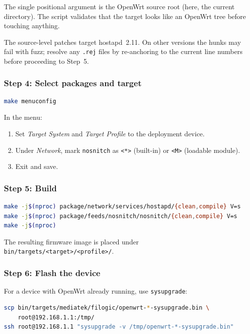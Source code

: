 \noindent The single positional argument is the OpenWrt source root
(here, the current directory). The script validates that the target
looks like an OpenWrt tree before touching anything.

The source-level patches target hostapd~2.11. On other versions the
hunks may fail with fuzz; resolve any \texttt{.rej} files by
re-anchoring to the current line numbers before proceeding to Step~5.

\subsubsection{Step 4: Select packages and target}

\begin{lstlisting}[language=bash]
make menuconfig
\end{lstlisting}

\noindent In the menu:

\begin{enumerate}
  \item Set \emph{Target System} and \emph{Target Profile} to the
  deployment device.
  \item Under \emph{Network}, mark \texttt{nosnitch} as \texttt{<*>}
  (built-in) or \texttt{<M>} (loadable module).
  \item Exit and save.
\end{enumerate}

\subsubsection{Step 5: Build}

\begin{lstlisting}[language=bash]
make -j$(nproc) package/network/services/hostapd/{clean,compile} V=s
make -j$(nproc) package/feeds/nosnitch/nosnitch/{clean,compile} V=s
make -j$(nproc)
\end{lstlisting}

\noindent The resulting firmware image is placed under
\texttt{bin/targets/<target>/<profile>/}.

\subsubsection{Step 6: Flash the device}

For a device with OpenWrt already running, use \texttt{sysupgrade}:

\begin{lstlisting}[language=bash]
scp bin/targets/mediatek/filogic/openwrt-*-sysupgrade.bin \
    root@192.168.1.1:/tmp/
ssh root@192.168.1.1 "sysupgrade -v /tmp/openwrt-*-sysupgrade.bin"
\end{lstlisting}

